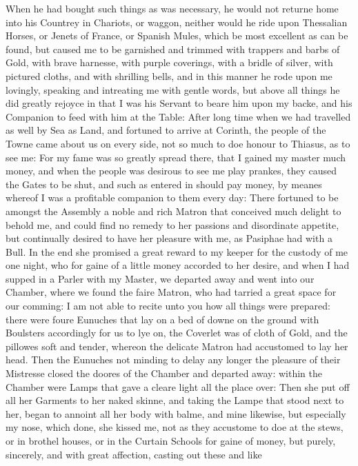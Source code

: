 When he had bought such things as was necessary, he would not returne home into
his Countrey in Chariots, or waggon, neither would he ride upon Thessalian
Horses, or Jenets of France, or Spanish Mules, which be most excellent as can
be found, but caused me to be garnished and trimmed with trappers and barbs of
Gold, with brave harnesse, with purple coverings, with a bridle of silver, with
pictured cloths, and with shrilling bells, and in this manner he rode upon me
lovingly, speaking and intreating me with gentle words, but above all things he
did greatly rejoyce in that I was his Servant to beare him upon my backe, and
his Companion to feed with him at the Table: After long time when we had
travelled as well by Sea as Land, and fortuned to arrive at Corinth, the people
of the Towne came about us on every side, not so much to doe honour to Thiasus,
as to see me: For my fame was so greatly spread there, that I gained my master
much money, and when the people was desirous to see me play prankes, they
caused the Gates to be shut, and such as entered in should pay money, by meanes
whereof I was a profitable companion to them every day: There fortuned to be
amongst the Assembly a noble and rich Matron that conceived much delight to
behold me, and could find no remedy to her passions and disordinate appetite,
but continually desired to have her pleasure with me, as Pasiphae had with a
Bull. In the end she promised a great reward to my keeper for the custody of me
one night, who for gaine of a little money accorded to her desire, and when I
had supped in a Parler with my Master, we departed away and went into our
Chamber, where we found the faire Matron, who had tarried a great space for our
comming: I am not able to recite unto you how all things were prepared: there
were foure Eunuches that lay on a bed of downe on the ground with Boulsters
accordingly for us to lye on, the Coverlet was of cloth of Gold, and the
pillowes soft and tender, whereon the delicate Matron had accustomed to lay her
head. Then the Eunuches not minding to delay any longer the pleasure of their
Mistresse closed the doores of the Chamber and departed away: within the
Chamber were Lamps that gave a cleare light all the place over: Then she put
off all her Garments to her naked skinne, and taking the Lampe that stood next
to her, began to annoint all her body with balme, and mine likewise, but
especially my nose, which done, she kissed me, not as they accustome to doe at
the stews, or in brothel houses, or in the Curtain Schools for gaine of money,
but purely, sincerely, and with great affection, casting out these and like
